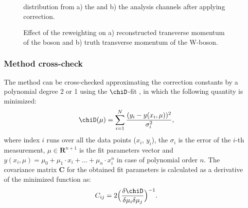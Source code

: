 \begin{figure}[!tbp]
\begin{minipage}[h]{0.5\linewidth}
\end{minipage}
\hfill
\begin{minipage}[h]{0.5\linewidth}
\end{minipage}
\caption{\sumet distribution from a) the \wenu and b) the \wmunu analysis channels after applying \sumet correction. }
\label{HadrRecoil:CorrSumet}
\end{figure}

\begin{figure}[!tbp]
\begin{minipage}[h]{0.49\linewidth}
\end{minipage}
\hfill
\begin{minipage}[h]{0.49\linewidth}
\end{minipage}
\caption{Effect of the \sumet reweighting on a) reconstructed transverse momentum of the boson and b) truth transverse momentum of the W-boson.}
\label{HadrRecoil:PtSpectrum}
\end{figure}

\subsubsection{Method cross-check}

The method can be cross-checked approximating the correction constants by a polynomial degree 2 or 1 using the $\chiD$-fit \cite{Watson1967}, in which the following quantity is minimized:
\begin{equation}
\chiD (\mu) = \sum_{i=1}^{N} \frac{(y_i - y(x_i , \mu ))^2}{\sigma_i^2},
\end{equation}
where  index $i$ runs over all the data points ($x_i$, $y_i$), the $\sigma_i$ is the error of the $i$-th measurement, $\mu\in \boldsymbol{R}^{n+1}$ is the fit parameters vector and $y(x_i, \mu)=\mu_0+\mu_1\cdot x_i +... + \mu_n \cdot x_i^n$ in case of polynomial order $n$.
The covariance matrix  $\mathbf{C}$ for the obtained fit parameters is calculated as a derivative of the minimized \chiD function as:
\begin{equation}
C_{ij}=2\Big(\frac{\delta\chiD}{\delta \mu_i \delta \mu_j} \Big)^{-1}.
\end{equation}


